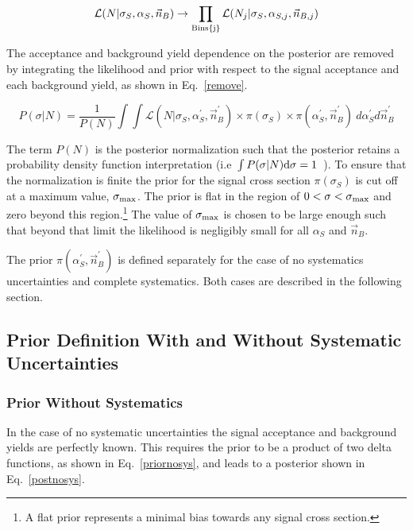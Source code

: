 \begin{equation}
\label{bins}
\mathcal{L}(N|\sigma_{S},\alpha_{S}, \vec{n}_{B}) \rightarrow \prod_{\rm{Bins}\{j\}} \mathcal{L}(N_{j}|\sigma_{S},\alpha_{S,j}, \vec{n}_{B,j})
\end{equation}

The acceptance and background yield dependence on the posterior are removed by integrating the likelihood and prior with respect to the signal acceptance and each background yield, as shown in Eq.~\ref{remove}.

\begin{equation}
\label{remove}
P(\sigma|N) = \frac{1}{P(N)} \int \int \mathcal{L}(N|\sigma_{S},\alpha^{'}_{S}, \vec{n}^{'}_{B}) \times \pi(\sigma_{S}) \times \pi(\alpha^{'}_{S}, \vec{n}^{'}_{B}) ~ d\alpha^{'}_{S} d\vec{n}^{'}_{B}
\end{equation}

\noindent The term $P(N)$ is the posterior normalization such that the posterior retains a probability density function interpretation (i.e~$\int P(\sigma|N) \rm{d}\sigma = 1$~). To ensure that the normalization is finite the prior for the signal cross section $\pi(\sigma_{S})$ is cut off at a maximum value, $\sigma_{\rm{max}}$. The prior is flat in the region of $0<\sigma<\sigma_{\rm{max}}$ and zero beyond this region.\footnote{A flat prior represents a minimal bias towards any signal cross section.} The value of $\sigma_{\rm{max}}$ is chosen to be large enough such that beyond that limit the likelihood is negligibly small for all $\alpha_{S}$ and $\vec{n}_{B}$.

The prior $\pi(\alpha^{'}_{S}, \vec{n}^{'}_{B})$ is defined separately for the case of no systematics uncertainties and complete systematics. Both cases are described in the following section.

\subsection{Prior Definition With and Without Systematic Uncertainties}

\subsubsection{Prior Without Systematics}

In the case of no systematic uncertainties the signal acceptance and background yields are perfectly known. This requires the prior to be a product of two delta functions, as shown in Eq.~\ref{priornosys}, and leads to a posterior shown in Eq.~\ref{postnosys}.

